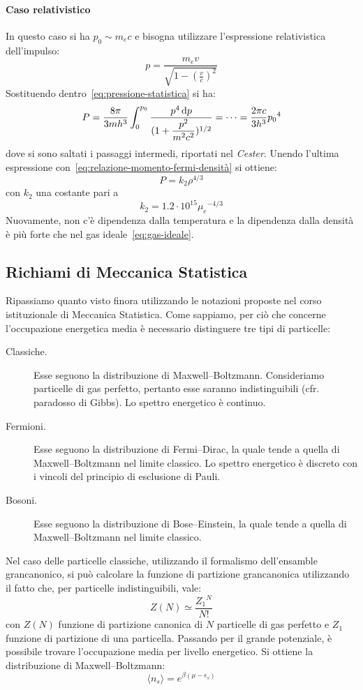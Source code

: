 \paragraph{Caso relativistico}
In questo caso si ha $p_0 \sim m_e c$ e bisogna utilizzare l'espressione relativistica dell'impulso:
\[
p= \dfrac{m_e v}{\sqrt{1- (\frac{v}{c})^2}}
\]
Sostituendo dentro~\eqref{eq:pressione-statistica} si ha:
\[
P = \dfrac{8\pi}{3mh^3} \int_0^{p_0} \dfrac{p^4 \mathop{\mathrm{{}d}}\mathopen{} p}{(1 + \dfrac{p^2}{m^2c^2})^{1/2}} = \dots = \dfrac{2\pi c}{3h^3}{p_0}^4
\]
dove si sono saltati i passaggi intermedi, riportati nel \emph{Cester}. Unendo l'ultima espressione con~\eqref{eq:relazione-momento-fermi-densità} si ottiene:
\begin{equation}\label{eq:pressione-degenerazione-relativistica}
    P = k_2 \rho^{4/3}
\end{equation}
con $k_2$ una costante pari a
\[
k_2 = 1.2 \cdot 10^{15} {\mu_e}^{-4/3}
\]
Nuovamente, non c'è dipendenza dalla temperatura e la dipendenza dalla densità è più forte che nel gas ideale~\eqref{eq:gas-ideale}.

\subsection{Richiami di Meccanica Statistica}
Ripassiamo quanto visto finora utilizzando le notazioni proposte nel corso istituzionale di Meccanica Statistica. Come sappiamo, per ciò che concerne l'occupazione energetica media è necessario distinguere tre tipi di particelle:
\begin{description}
\item[Classiche.] Esse seguono la distribuzione di Maxwell--Boltzmann. Consideriamo particelle di gas perfetto, pertanto esse saranno indistinguibili (cfr. paradosso di Gibbs). Lo spettro energetico è continuo.
\item[Fermioni.] Esse seguono la distribuzione di Fermi--Dirac, la quale tende a quella di Maxwell--Boltzmann nel limite classico. Lo spettro energetico è discreto con i vincoli del principio di esclusione di Pauli. 
\item[Bosoni.] Esse seguono la distribuzione di Bose--Einstein, la quale tende a quella di Maxwell--Boltzmann nel limite classico.
\end{description}

Nel caso delle particelle classiche, utilizzando il formalismo dell'ensamble grancanonico, si può calcolare la funzione di partizione grancanonica utilizzando il fatto che, per particelle indistinguibili, vale:
\[
Z(N) \simeq \frac{{Z_1}^N}{N!}
\]
con $Z(N)$ funzione di partizione canonica di $N$ particelle di gas perfetto e $Z_1$ funzione di partizione di una particella. Passando per il grande potenziale, è possibile trovare l'occupazione media per livello energetico. Si ottiene la distribuzione di Maxwell--Boltzmann:\
\begin{equation}
    \langle n_s  \rangle = e^{\beta(\mu - \epsilon_s)} 
\end{equation}

